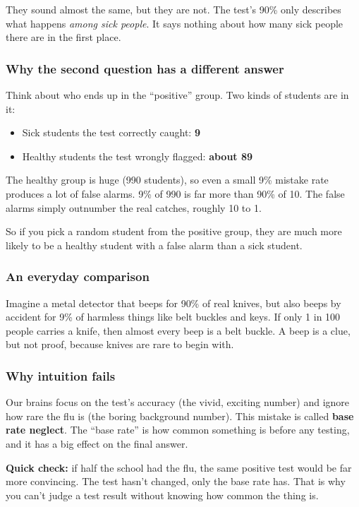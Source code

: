 They sound almost the same, but they are not. The test's 90\% only describes what happens \emph{among sick people}. It says nothing about how many sick people there are in the first place.

\subsubsection*{Why the second question has a different answer}

Think about who ends up in the ``positive'' group. Two kinds of students are in it:

\begin{itemize}
  \item Sick students the test correctly caught: \textbf{9}
  \item Healthy students the test wrongly flagged: \textbf{about 89}
\end{itemize}

The healthy group is huge (990 students), so even a small 9\% mistake rate produces a lot of false alarms. 9\% of 990 is far more than 90\% of 10. The false alarms simply outnumber the real catches, roughly 10 to 1.

So if you pick a random student from the positive group, they are much more likely to be a healthy student with a false alarm than a sick student.

\subsubsection*{An everyday comparison}

Imagine a metal detector that beeps for 90\% of real knives, but also beeps by accident for 9\% of harmless things like belt buckles and keys. If only 1 in 100 people carries a knife, then almost every beep is a belt buckle. A beep is a clue, but not proof, because knives are rare to begin with.

\subsubsection*{Why intuition fails}

Our brains focus on the test's accuracy (the vivid, exciting number) and ignore how rare the flu is (the boring background number). This mistake is called \textbf{base rate neglect}. The ``base rate'' is how common something is before any testing, and it has a big effect on the final answer.

\textbf{Quick check:} if half the school had the flu, the same positive test would be far more convincing. The test hasn't changed, only the base rate has. That is why you can't judge a test result without knowing how common the thing is.

